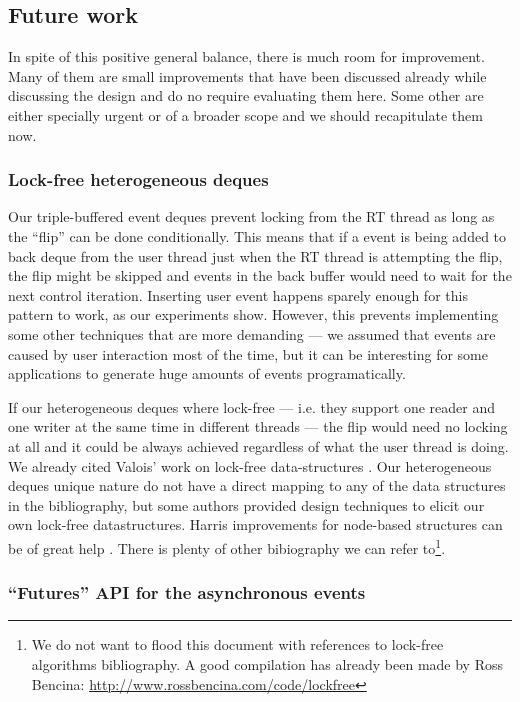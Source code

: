 \subsection{Future work}

In spite of this positive general balance, there is much room for
improvement. Many of them are small improvements that have been
discussed already while discussing the design and do no require
evaluating them here. Some other are either specially urgent or of a
broader scope and we should recapitulate them now.

\subsubsection{Lock-free heterogeneous deques}

Our triple-buffered event deques prevent locking from the RT thread as
long as the ``flip'' can be done conditionally. This means that if a
event is being added to back deque from the user thread just when the
RT thread is attempting the flip, the flip might be skipped and events
in the back buffer would need to wait for the next control
iteration. Inserting user event happens sparely enough for this
pattern to work, as our experiments show. However, this prevents
implementing some other techniques that are more demanding --- we
assumed that events are caused by user interaction most of the time,
but it can be interesting for some applications to generate
huge amounts of events programatically.

If our heterogeneous deques where lock-free --- i.e. they support one
reader and one writer at the same time in different threads --- the
flip would need no locking at all and it could be always achieved
regardless of what the user thread is doing. We already cited Valois'
work on lock-free data-structures \cite{valois96lockfree,
  michael95correction}. Our heterogeneous deques unique nature do not
have a direct mapping to any of the data structures in the
bibliography, but some authors provided design techniques to elicit
our own lock-free datastructures. Harris improvements for node-based
structures can be of great help \cite{harris01pragmatic}. There is
plenty of other bibiography we can refer to\footnote{We do not want to
 flood this document with references to lock-free algorithms
 bibliography. A good compilation has already been made by Ross
 Bencina: \url{http://www.rossbencina.com/code/lockfree}}.

\subsubsection{``Futures'' API for the asynchronous events}

